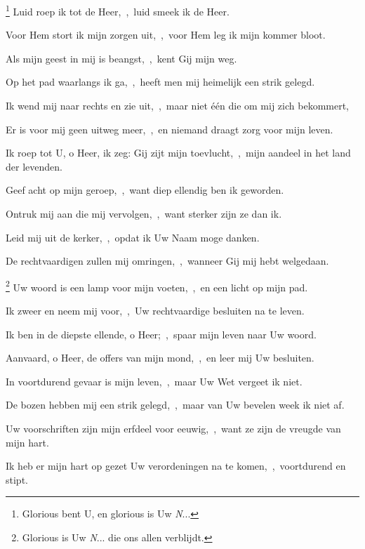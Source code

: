 \documentclass[12pt,twoside,a5paper]{article}
\begin{document}
\begin{halfparskip}
  \footnote{ Glorious bent U, en glorious is Uw \emph{N}...} Luid roep ik tot de Heer,~\sep\ luid smeek ik de Heer.

  Voor Hem stort ik mijn zorgen uit,~\sep\ voor Hem leg ik mijn kommer bloot.

  Als mijn geest in mij is beangst,~\sep\ kent Gij mijn weg.

  Op het pad waarlangs ik ga,~\sep\ heeft men mij heimelijk een strik gelegd.

  Ik wend mij naar rechts en zie uit,~\sep\ maar niet één die om mij zich bekommert,

  Er is voor mij geen uitweg meer,~\sep\ en niemand draagt zorg voor mijn leven.

  Ik roep tot U, o Heer, ik zeg: Gij zijt mijn toevlucht,~\sep\ mijn aandeel in het land der levenden.

  Geef acht op mijn geroep,~\sep\ want diep ellendig ben ik geworden.

  Ontruk mij aan die mij vervolgen,~\sep\ want sterker zijn ze dan ik.

  Leid mij uit de kerker,~\sep\ opdat ik Uw Naam moge danken.

  De rechtvaardigen zullen mij omringen,~\sep\ wanneer Gij mij hebt welgedaan.
\end{halfparskip}

\begin{halfparskip}
  \footnote{ Glorious is Uw \emph{N}... die ons allen verblijdt.} Uw woord is een lamp voor mijn voeten,~\sep\ en een licht op mijn pad.

  Ik zweer en neem mij voor,~\sep\ Uw rechtvaardige besluiten na te leven.

  Ik ben in de diepste ellende, o Heer;~\sep\ spaar mijn leven naar Uw woord.

  Aanvaard, o Heer, de offers van mijn mond,~\sep\ en leer mij Uw besluiten.

  In voortdurend gevaar is mijn leven,~\sep\ maar Uw Wet vergeet ik niet.

  De bozen hebben mij een strik gelegd,~\sep\ maar van Uw bevelen week ik niet af.

  Uw voorschriften zijn mijn erfdeel voor eeuwig,~\sep\ want ze zijn de vreugde van mijn hart.

  Ik heb er mijn hart op gezet Uw verordeningen na te komen,~\sep\ voortdurend en stipt.
\end{halfparskip}
\end{document}
